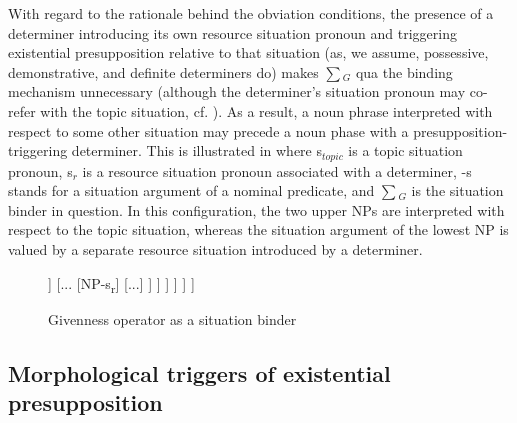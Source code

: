 \documentclass[output=paper,modfonts,nonflat]{langsci/langscibook}
\begin{document}
With regard to the rationale behind the obviation conditions, the presence of a determiner introducing its own resource situation pronoun and triggering existential presupposition relative to that situation (as, we assume, possessive, demonstrative, and definite determiners do) makes $\sum$$_{G}$ qua the binding mechanism unnecessary (although the determiner's situation pronoun may co-refer with the topic situation, cf. \citealt{Schwarz:2009}). As a result, a noun phrase interpreted with respect to some other situation may precede a noun phase with a presupposition-triggering determiner. This is illustrated in  where s$_{topic}$ is a topic situation pronoun, s$_{r}$ is a resource situation pronoun associated with a determiner, -s stands for a situation argument of a nominal predicate, and $\sum$$_{G}$ is the situation binder in question. In this configuration, the two upper NPs are interpreted with respect to the topic situation, whereas the situation argument of the lowest NP is valued by a separate resource situation introduced by a determiner.

\begin{figure}
\begin{forest}
	[...
	[s\textsubscript{topic}] [...
	[Σ\textsubscript{G}] [...
	[NP-s\textsubscript{topic}] [...
	[NP-s\textsubscript{topic}] [...
	[Det [s\textsubscript{r}]] [...
	[NP-s\textsubscript{r}] [...]
	]
	]
	]
	]
	]
	]
\end{forest}
\caption{Givenness operator as a situation binder}\label{fig:tree2}
\end{figure}



\subsection{Morphological triggers of existential presupposition}
\end{document}
